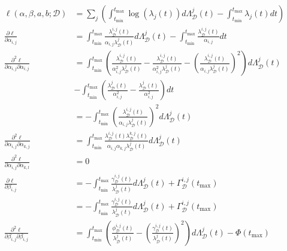 \documentclass[honours,12pt]{unswthesis}
\numberwithin{equation}{section}
\begin{document}
\begin{equation*}
	\begin{align}
		\ell(\alpha,\beta,a,b; \mathcal{D}) &= \sum_j\left( \int_{t_\mathrm{min}}^{t_\mathrm{max}} \log\left(\lambda_j(t)\right)d\Lambda_\mathcal{D}^j(t) - \int_{t_\mathrm{min}}^{t_\mathrm{max}}\lambda_j(t)dt \right) \\
		\frac{\partial\ell}{\partial\alpha_{i,j}} &= \int_{t_\mathrm{min}}^{t_\mathrm{max}} \frac{\lambda_\mathcal{D}^{i,j}(t)}{\alpha_{i,j}\lambda_\mathcal{D}^j(t)}d\Lambda_\mathcal{D}^j(t) - \int_{t_\mathrm{min}}^{t_\mathrm{max}} \frac{\lambda_\mathcal{D}^{i,j}(t)}{\alpha_{i,j}}dt \\
		\frac{\partial^2\ell}{\partial\alpha_{i,j}\partial\alpha_{i,j}} &= \int_{t_\mathrm{min}}^{t_\mathrm{max}} \left( \frac{\lambda_\mathcal{D}^{i,j}(t)}{\alpha_{i,j}^2\lambda_\mathcal{D}^j(t)} - \frac{\lambda_\mathcal{D}^{i,j}(t)}{\alpha_{i,j}^2\lambda_\mathcal{D}^j(t)} - \left(\frac{\lambda_\mathcal{D}^{i,j}(t)}{\alpha_{i,j}\lambda_\mathcal{D}^j(t)}\right)^2 \right) d\Lambda_\mathcal{D}^j(t) \\&- \int_{t_\mathrm{min}}^{t_\mathrm{max}} \left( \frac{\lambda_\mathcal{D}^j(t)}{\alpha_{i,j}^2} - \frac{\lambda_\mathcal{D}^j(t)}{\alpha_{i,j}^2} \right) dt\\
		&= - \int_{t_\mathrm{min}}^{t_\mathrm{max}} \left(\frac{\lambda_\mathcal{D}^{i,j}(t)}{\alpha_{i,j}\lambda_\mathcal{D}^j(t)}\right)^2 d\Lambda_\mathcal{D}^j(t)\\
		\frac{\partial^2\ell}{\partial\alpha_{i,j}\partial\alpha_{k,j}} &= \int_{t_\mathrm{min}}^{t_\mathrm{max}} \frac{\lambda_\mathcal{D}^{i,j}(t)\lambda_\mathcal{D}^{k,j}(t)}{\alpha_{i,j}\alpha_{k,j}\lambda_\mathcal{D}^j(t)} d\Lambda_\mathcal{D}^j(t)\\
		\frac{\partial^2\ell}{\partial\alpha_{i,j}\partial\alpha_{k,l}}  &= 0\\
		\frac{\partial\ell}{\partial\beta_{i,j}} &= -\int_{t_\mathrm{min}}^{t_\mathrm{max}}\frac{\gamma_\mathcal{D}^{i,j}(t)}{\lambda_\mathcal{D}^{j}(t)}d\Lambda_\mathcal{D}^j(t) + \Gamma_\mathcal{D}^{i,j}(t_\mathrm{max}) \\
		&= -\int_{t_\mathrm{min}}^{t_\mathrm{max}}\frac{\gamma_\mathcal{D}^{i,j}(t)}{\lambda_\mathcal{D}^{j}(t)}d\Lambda_\mathcal{D}^j(t) + \Gamma_\mathcal{D}^{i,j}(t_\mathrm{max}) \\
		\frac{\partial^2\ell}{\partial\beta_{i,j}\partial\beta_{i,j}} &= \int_{t_\mathrm{min}}^{t_\mathrm{max}} \left( \frac{\phi_\mathcal{D}^{i,j}(t)}{\lambda_\mathcal{D}^{j}(t)} - \left(\frac{\gamma_\mathcal{D}^{i,j}(t)}{\lambda_\mathcal{D}^{j}(t)}\right)^2 \right) d\Lambda_\mathcal{D}^j(t) - \Phi(t_\mathrm{max}) \\

\end{align}
\end{equation*}
\end{document}
